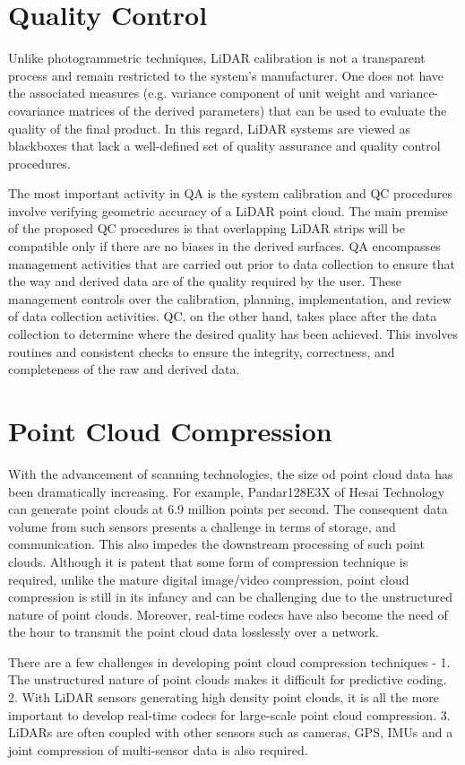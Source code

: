 \section{Quality Control}
Unlike photogrammetric techniques, LiDAR calibration is not a transparent process and remain restricted to the system's manufacturer. One does not have the associated measures (e.g. variance component of unit weight and variance-covariance matrices of the derived parameters) that can be used to evaluate the quality of the final product. In this regard, LiDAR systems are viewed as blackboxes that lack a well-defined set of quality assurance and quality control procedures.

The most important activity in QA is the system calibration and QC procedures involve verifying geometric accuracy of a LiDAR point cloud. The main premise of the proposed QC procedures is that overlapping LiDAR strips will be compatible only if there are no biases in the derived surfaces. QA encompasses management activities that are carried out prior to data collection to ensure that the way and derived data are of the quality required by the user. These management controls over the calibration, planning, implementation, and review of data collection activities. QC, on the other hand, takes place after the data collection to determine where the desired quality has been achieved. This involves routines and consistent checks to ensure the integrity, correctness, and completeness of the raw and derived data.




\section{Point Cloud Compression}
With the advancement of scanning technologies, the size od point cloud data has been dramatically increasing. For example, Pandar128E3X of Hesai Technology can generate point clouds at 6.9 million points per second. The consequent data volume from such sensors presents a challenge in terms of storage, and communication. This also impedes the downstream processing of such point clouds. Although it is patent that some form of compression technique is required, unlike the mature digital image/video compression, point cloud compression is still in its infancy and can be challenging due to the unstructured nature of point clouds. Moreover, real-time codecs have also become the need of the hour to transmit the point cloud data losslessly over a network.

There are a few challenges in developing point cloud compression techniques - 1. The unstructured nature of point clouds makes it difficult for predictive coding. 2. With LiDAR sensors generating high density point clouds, it is all the more important to develop real-time codecs for large-scale point cloud compression. 3. LiDARs are often coupled with other sensors such as cameras, GPS, IMUs and a joint compression of multi-sensor data is also required.


